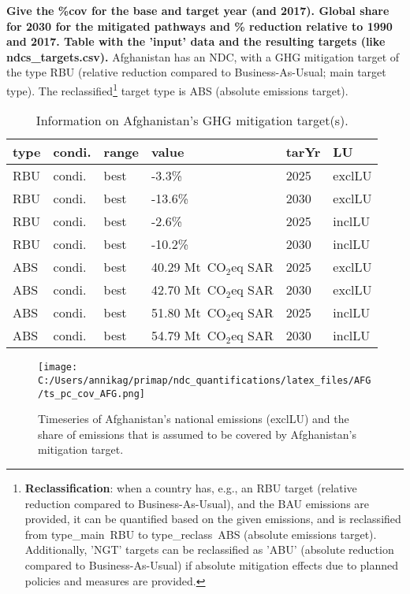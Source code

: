 \documentclass[12pt]{article}
\begin{document}
 \textbf{ 
 Give the \%cov for the base and target year (and 2017).
 Global share for 2030 for the mitigated pathways and \% reduction relative to 1990 and 2017.
 Table with the 'input' data and the resulting targets (like ndcs\_targets.csv).}
 Afghanistan has an NDC, with a GHG mitigation target of the type RBU (relative reduction compared to Business-As-Usual; main target type).
 The reclassified\footnote{\textbf{Reclassification}: when a country has, e.g., an RBU target (relative reduction compared to Business-As-Usual), and the BAU emissions are provided, it can be quantified based on the given emissions, and is reclassified from type\_main~RBU to type\_reclass~ABS (absolute emissions target).
 Additionally, 'NGT' targets can be reclassified as 'ABU' (absolute reduction compared to Business-As-Usual) if absolute mitigation effects due to planned policies and measures are provided.}  target type is ABS (absolute emissions target).
 \begin{table}[htbp]
 \centering
 \caption{Information on Afghanistan's GHG mitigation target(s).}
 \label{tab:mitiTars}
 \begin{tabular}{l l l l l l }
 \bfseries type & \bfseries condi. & \bfseries range & \bfseries value & \bfseries tarYr & \bfseries LU \tabularnewline \hline
 RBU & condi. & best & -3.3\% & 2025 & exclLU \tabularnewline 
 RBU & condi. & best & -13.6\% & 2030 & exclLU \tabularnewline 
 RBU & condi. & best & -2.6\% & 2025 & inclLU \tabularnewline 
 RBU & condi. & best & -10.2\% & 2030 & inclLU \tabularnewline 
 ABS & condi. & best & 40.29 Mt~CO$_2$eq SAR & 2025 & exclLU \tabularnewline 
 ABS & condi. & best & 42.70 Mt~CO$_2$eq SAR & 2030 & exclLU \tabularnewline 
 ABS & condi. & best & 51.80 Mt~CO$_2$eq SAR & 2025 & inclLU \tabularnewline 
 ABS & condi. & best & 54.79 Mt~CO$_2$eq SAR & 2030 & inclLU \tabularnewline 
 \end{tabular}
 \end{table}
 \begin{figure}[htbp]
 \centering
 \texttt{[image: C:/Users/annikag/primap/ndc\_quantifications/latex\_files/AFG/ts\_pc\_cov\_AFG.png]}
 \caption{Timeseries of Afghanistan's national emissions (exclLU) and the share of emissions that is assumed to be covered by Afghanistan's mitigation target.}
 \label{fig:tsPcCov}
 \end{figure}
\end{document}
